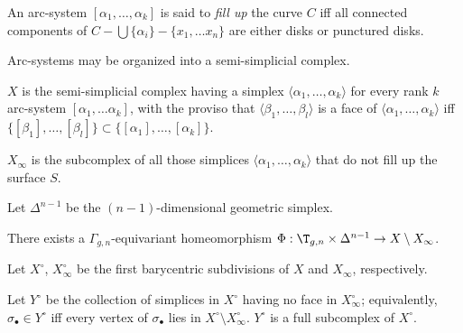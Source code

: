 An arc-system $[\alpha_1, \ldots, \alpha_k]$ is said to \emph{fill up} the curve $C$
iff all connected components of $C - \bigcup\{\alpha_i\} - \{x_1,\ldots x_n\}$ are either
disks or punctured disks.

Arc-systems may be organized into a semi-simplicial complex.
\begin{definition}
  $X$ is the semi-simplicial complex having a simplex $\langle\alpha_1, \ldots, \alpha_k\rangle$
  for every rank $k$ arc-system $[\alpha_1, \ldots \alpha_k]$, with the proviso that
  $\langle\beta_1, \ldots, \beta_l\rangle$ is a face of $\langle\alpha_1, \ldots, \alpha_k\rangle$ iff $\{ [\beta_1], \ldots, [\beta_l]
  \} \subset \{ [\alpha_1], \ldots, [\alpha_k] \}$.
  
  $X_\infty$ is the subcomplex of all those simplices $\langle\alpha_1, \ldots, \alpha_k\rangle$
  that do not fill up the surface $S$.
\end{definition}

Let $\Delta^{n-1}$ be the $(n-1)$-dimensional geometric simplex.
\begin{theorem}
There exists a $\Gamma_{g,n}$-equivariant homeomorphism $\Phi: \T_{g,n} \times
\Delta^{n-1} \to X \setminus X_\infty$.
\end{theorem}

Let $X^\circ$, $X_\infty^\circ$ be the first barycentric subdivisions of $X$
and $X_\infty$, respectively.

\begin{definition}
  Let $Y^\circ$ be the collection of simplices in $X^\circ$ having no face in
  $X_\infty^\circ$; equivalently, $\sigma_\bullet \in Y^\circ$ iff every vertex of $\sigma_\bullet$
  lies in $X^\circ \setminus X_\infty^\circ$.  $Y^\circ$ is a full subcomplex of $X^\circ$.
\end{definition}


